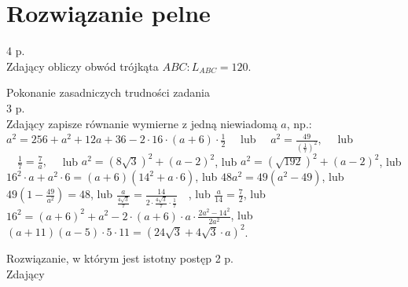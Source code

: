 \documentclass[10pt]{article}
\begin{document}
\section*{Rozwiązanie pelne}
4 p.\\
Zdający obliczy obwód trójkąta $A B C: L_{A B C}=120$.

Pokonanie zasadniczych trudności zadania\\
3 p.\\
Zdający zapisze równanie wymierne z jedną niewiadomą $a$, np.:\\
$a^{2}=256+a^{2}+12 a+36-2 \cdot 16 \cdot(a+6) \cdot \frac{1}{2} \quad$ lub $\quad a^{2}=\frac{49}{\left(\frac{1}{7}\right)^{2}}, \quad$ lub $\quad \frac{1}{7}=\frac{7}{a}, \quad$ lub $a^{2}=(8 \sqrt{3})^{2}+(a-2)^{2}$, lub $a^{2}=(\sqrt{192})^{2}+(a-2)^{2}$, lub $16^{2} \cdot a+a^{2} \cdot 6=(a+6)\left(14^{2}+a \cdot 6\right)$, lub $48 a^{2}=49\left(a^{2}-49\right)$, lub $49\left(1-\frac{49}{a^{2}}\right)=48$, lub $\frac{a}{\frac{4 \sqrt{3}}{7}}=\frac{14}{2 \cdot \frac{4 \sqrt{3}}{7} \cdot \frac{1}{7}} \quad$, lub $\frac{a}{14}=\frac{7}{2}$, lub\\
$16^{2}=(a+6)^{2}+a^{2}-2 \cdot(a+6) \cdot a \cdot \frac{2 a^{2}-14^{2}}{2 a^{2}}$, lub $(a+11)(a-5) \cdot 5 \cdot 11=(24 \sqrt{3}+4 \sqrt{3} \cdot a)^{2}$.

Rozwiązanie, w którym jest istotny postęp 2 p.\\
Zdający
\end{document}
